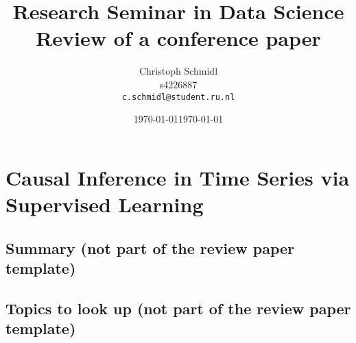 \documentclass[a4paper]{article}
\title{Research Seminar in Data Science\\Review of a conference paper}
\author{
  Christoph Schmidl\\ s4226887\\      \texttt{c.schmidl@student.ru.nl}
}
\date{\today}
\date{\today}
\begin{document}
\maketitle





\section{Causal Inference in Time Series via Supervised Learning}

\subsection{Summary (not part of the review paper template)}



\subsection{Topics to look up (not part of the review paper template)}
\end{document}
